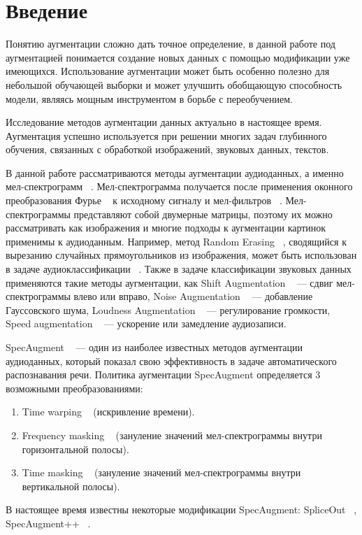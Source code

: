 \documentclass[12pt, fleqn]{article}
\begin{document}
\newpage


\section{Введение}

Понятию аугментации сложно дать точное определение, в данной работе под аугментацией понимается создание новых данных с помощью модификации уже имеющихся. Использование аугментации может быть особенно полезно для небольшой обучающей выборки и может улучшить обобщающую способность модели, являясь мощным инструментом в борьбе с переобучением. 

Исследование методов аугментации данных актуально в настоящее время. Аугментация успешно используется при решении многих задач глубинного обучения, связанных с обработкой изображений, звуковых данных, текстов.

В данной работе рассматриваются методы аугментации аудиоданных, а именно мел-спектрограмм ~\cite{MelSpectrogram}. Мел-спектрограмма получается после применения оконного преобразования Фурье ~\cite{Fourier} к исходному сигналу и мел-фильтров ~\cite{MelScale}. Мел-спектрограммы представляют собой двумерные матрицы, поэтому их можно рассматривать как изображения и многие подходы к аугментации картинок применимы к аудиоданным. Например, метод Random Erasing ~\cite{RandomErasing}, сводящийся к вырезанию случайных прямоугольников из изображения, может быть использован в задаче аудиоклассификации  ~\cite{RandomErasingClassification}. Также в задаче классификации звуковых данных применяются такие методы аугментации, как Shift Augmentation ~\cite{AudioClassification} --- сдвиг мел-спектрограммы влево или вправо, Noise Augmentation ~\cite{AudioClassification} --- добавление Гауссовского шума, Loudness Augmentation ~\cite{AudioClassification} --- регулирование громкости, Speed augmentation ~\cite{AudioClassification} --- ускорение или замедление аудиозаписи.

SpecAugment ~\cite{SpecAugment} --- один из наиболее известных методов аугментации аудиоданных, который показал свою эффективность в задаче автоматического распознавания речи. Политика аугментации SpecAugment определяется 3 возможными преобразованиями: 
\begin{enumerate}
    \item Time warping ~\cite{SpecAugment} (искривление времени).
    \item Frequency masking ~\cite{SpecAugment} (зануление значений мел-спектрограммы внутри горизонтальной полосы).
    \item Time masking ~\cite{SpecAugment} (зануление значений мел-спектрограммы внутри вертикальной полосы).
\end{enumerate}
В настоящее время известны некоторые модификации SpecAugment: SpliceOut ~\cite{SpliceOut}, SpecAugment++ ~\cite{SpecAugment++}.
\end{document}

